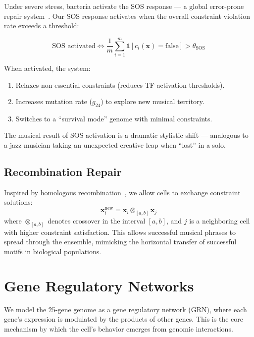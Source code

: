 \documentclass[11pt,a4paper]{article}
\begin{document}
Under severe stress, bacteria activate the SOS response --- a global error-prone repair system~\citep{radman1975}. Our SOS response activates when the overall constraint violation rate exceeds a threshold:

\begin{equation}
  \text{SOS activated} \iff \frac{1}{m}\sum_{i=1}^{m} \mathbb{1}[c_i(\mathbf{x}) = \text{false}] > \theta_{\text{SOS}}
\end{equation}

When activated, the system:
\begin{enumerate}
  \item Relaxes non-essential constraints (reduces TF activation thresholds).
  \item Increases mutation rate ($g_{24}$) to explore new musical territory.
  \item Switches to a ``survival mode'' genome with minimal constraints.
\end{enumerate}

The musical result of SOS activation is a dramatic stylistic shift --- analogous to a jazz musician taking an unexpected creative leap when ``lost'' in a solo.

\subsection{Recombination Repair}

Inspired by homologous recombination~\citep{pierce1989}, we allow cells to exchange constraint solutions:
\begin{equation}
  \mathbf{x}_i^{\text{new}} = \mathbf{x}_i \otimes_{[a,b]} \mathbf{x}_j
\end{equation}
where $\otimes_{[a,b]}$ denotes crossover in the interval $[a,b]$, and $j$ is a neighboring cell with higher constraint satisfaction. This allows successful musical phrases to spread through the ensemble, mimicking the horizontal transfer of successful motifs in biological populations.

\section{Gene Regulatory Networks}\label{sec:grn}

We model the 25-gene genome as a gene regulatory network (GRN), where each gene's expression is modulated by the products of other genes. This is the core mechanism by which the cell's behavior emerges from genomic interactions.
\end{document}
